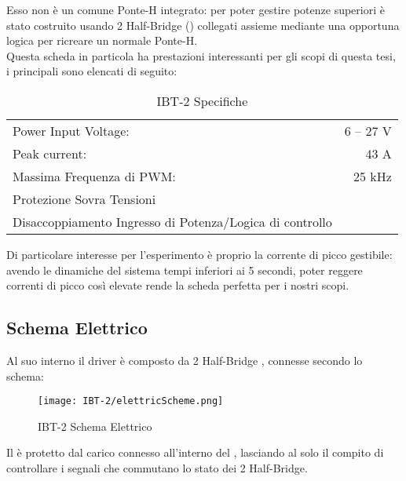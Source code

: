 \noindent
Esso non è un comune Ponte-H integrato: per poter gestire potenze superiori è stato costruito usando 2 Half-Bridge (\cite{BTS7960b}) collegati assieme mediante una opportuna logica per ricreare un normale Ponte-H.\\
Questa scheda in particola ha prestazioni interessanti per gli scopi di questa tesi, i principali sono elencati di seguito:\vspace{-8mm}
\begin{table}[H]
	\centering
	\caption[IBT-2 Specifiche]{IBT-2 Specifiche}
	\begin{tabular}[t]{|l r|}
		\hline
		Power Input Voltage:                                     & 6 -- 27 V \\
		Peak current:                                            & 43 A      \\
		Massima Frequenza di PWM:                                & 25 kHz    \\
		Protezione Sovra Tensioni                                &           \\
		Disaccoppiamento Ingresso di Potenza/Logica di controllo &           \\
		\hline
	\end{tabular}
\end{table}\vspace{-4mm}
\noindent
Di particolare interesse per l'esperimento è proprio la corrente di picco gestibile:
avendo le dinamiche del sistema tempi inferiori ai 5 secondi, poter reggere correnti di picco così elevate rende
la scheda perfetta per i nostri scopi.

\newpage
\subsection{Schema Elettrico}
Al suo interno il driver è composto da 2 Half-Bridge \cite{BTS7960b}, connesse secondo lo schema:
\begin{figure}[H]
	\centering
	\caption[IBT-2 Schema Elettrico]{IBT-2 Schema Elettrico}
	\texttt{[image: IBT-2/elettricScheme.png]}
\end{figure}\vspace{-5mm}

\noindent
Il \microC è protetto dal carico connesso all'interno del , lasciando al \microC solo il compito di controllare i segnali che commutano lo stato dei 2 Half-Bridge.
\newpage
